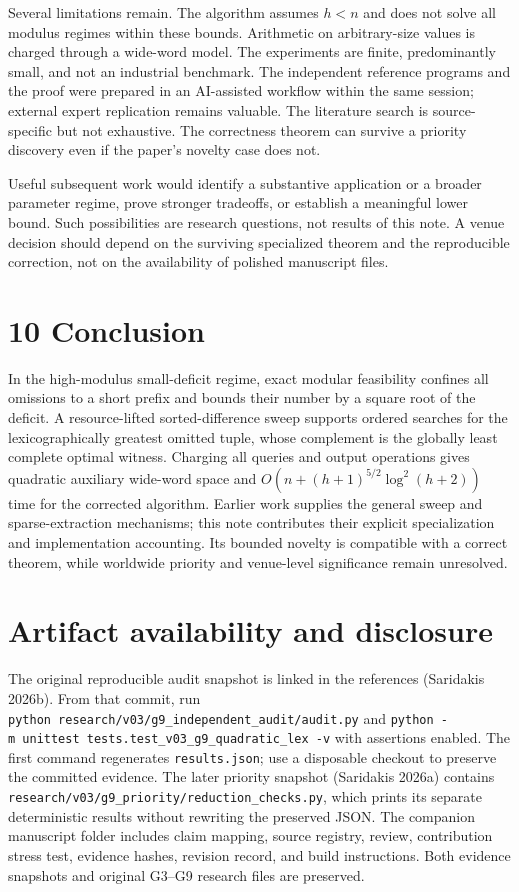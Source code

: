\documentclass[
  11pt,
  letterpaper,
]{article}
\begin{document}
Several limitations remain. The algorithm assumes \(h<n\) and does not
solve all modulus regimes within these bounds. Arithmetic on
arbitrary-size values is charged through a wide-word model. The
experiments are finite, predominantly small, and not an industrial
benchmark. The independent reference programs and the proof were
prepared in an AI-assisted workflow within the same session; external
expert replication remains valuable. The literature search is
source-specific but not exhaustive. The correctness theorem can survive
a priority discovery even if the paper's novelty case does not.

Useful subsequent work would identify a substantive application or a
broader parameter regime, prove stronger tradeoffs, or establish a
meaningful lower bound. Such possibilities are research questions, not
results of this note. A venue decision should depend on the surviving
specialized theorem and the reproducible correction, not on the
availability of polished manuscript files.

\hypertarget{conclusion}{%
\section{10 Conclusion}\label{conclusion}}

In the high-modulus small-deficit regime, exact modular feasibility
confines all omissions to a short prefix and bounds their number by a
square root of the deficit. A resource-lifted sorted-difference sweep
supports ordered searches for the lexicographically greatest omitted
tuple, whose complement is the globally least complete optimal witness.
Charging all queries and output operations gives quadratic auxiliary
wide-word space and \(O(n+(h+1)^{5/2}\log^2(h+2))\) time for the
corrected algorithm. Earlier work supplies the general sweep and
sparse-extraction mechanisms; this note contributes their explicit
specialization and implementation accounting. Its bounded novelty is
compatible with a correct theorem, while worldwide priority and
venue-level significance remain unresolved.

\hypertarget{artifact-availability-and-disclosure}{%
\section{Artifact availability and
disclosure}\label{artifact-availability-and-disclosure}}

The original reproducible audit snapshot is linked in the references
(Saridakis 2026b). From that commit, run
\texttt{python\ research/v03/g9\_independent\_audit/audit.py} and
\texttt{python\ -m\ unittest\ tests.test\_v03\_g9\_quadratic\_lex\ -v}
with assertions enabled. The first command regenerates
\texttt{results.json}; use a disposable checkout to preserve the
committed evidence. The later priority snapshot (Saridakis 2026a)
contains \texttt{research/v03/g9\_priority/reduction\_checks.py}, which
prints its separate deterministic results without rewriting the
preserved JSON. The companion manuscript folder includes claim mapping,
source registry, review, contribution stress test, evidence hashes,
revision record, and build instructions. Both evidence snapshots and
original G3--G9 research files are preserved.
\end{document}
